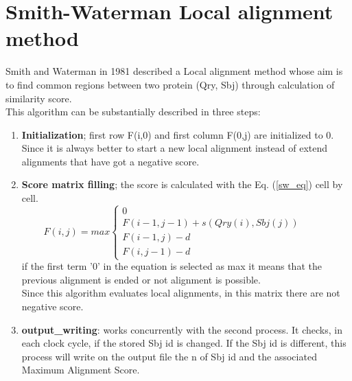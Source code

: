 \section{Smith-Waterman Local alignment method	}
Smith and Waterman in 1981 described a Local alignment method whose aim  is to find common regions between two protein (Qry, Sbj) through calculation of similarity score. \\
This algorithm can be substantially described in three steps:
\begin{enumerate}
	\item  \textbf{Initialization}; first row F(i,0) and first column F(0,j) are initialized to 0. Since it is always better to start a new local alignment instead of extend alignments that have got a negative score.
	 \item \textbf{Score matrix filling}; the score is calculated with the Eq. (\ref{sw_eq}) cell by cell.\\
	 \begin{equation}\label{sw_eq}
	 F(i,j) = max \begin{cases}
	
	 0 & \\
	  F(i-1,j-1) + s(Qry(i),Sbj(j))\qquad &\\
	   F(i-1,j)-d &\\
	   F(i,j-1)-d &
	 \end{cases} 
	 \end{equation}
	  if the first term '0' in the equation is selected as max it means that the previous alignment is ended or not alignment is possible. \\Since this algorithm evaluates local alignments, in this matrix there are not negative score.
	 \item   \textbf{output\_writing}: works concurrently with the second process. It checks, in each clock cycle, if the stored Sbj id is changed. If the Sbj id is different, this process will write on the output file the n of Sbj id and the associated Maximum Alignment Score.
	 
	
\end{enumerate}

